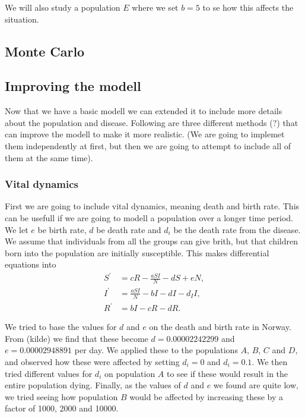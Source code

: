 \documentclass[a4paper]{article}
\let\Oldsubsection\subsection
\renewcommand{\subsection}{\FloatBarrier\Oldsubsection}
\let\Oldsubsubsection\subsubsection
\renewcommand{\subsubsection}{\FloatBarrier\Oldsubsubsection}
\begin{document}
We will also study a population $E$ where we set $b=5$ to se how this affects the situation. 


\subsection{Monte Carlo}

\subsection{Improving the modell}

Now that we have a basic modell we can extended it to include more details about the population and disease. Following are three different methods (?) that can improve the modell to make it more realistic. (We are going to implemet them independently at first, but then we are going to attempt to include all of them at the same time).

\subsubsection{Vital dynamics}

First we are going to include vital dynamics, meaning death and birth rate. This can be usefull if we are going to modell a population over a longer time period. We let $e$ be birth rate, $d$ be death rate and $d_i$ be the death rate from the disease. We assume that individuals from all the groups can give brith, but that children born into the population are initially susceptible. This makes differential equations into 
\begin{align} 
S ^ { \prime } & = c R - \frac { a S I } { N } - d S + e N, \\ 
I ^ { \prime } & = \frac { a S I } { N } - b I - d I - d _ { I } I, \\ 
R ^ { \prime } & = b I - c R - d R.
\end{align}

We tried to base the values for $d$ and $e$ on the death and birth rate in Norway. From (kilde) we find that these become $d=0.00002242299$ and $e=0.00002948891$ per day. We applied these to the populations $A$, $B$, $C$ and $D$, and observed how these were affected by setting $d_i=0$ and $d_i=0.1$. We then tried different values for $d_i$ on population $A$ to see if these would result in the entire population dying. Finally, as the values of $d$ and $e$ we found are quite low, we tried seeing how population $B$ would be affected by increasing these by a factor of 1000, 2000 and 10000. 
\end{document}
